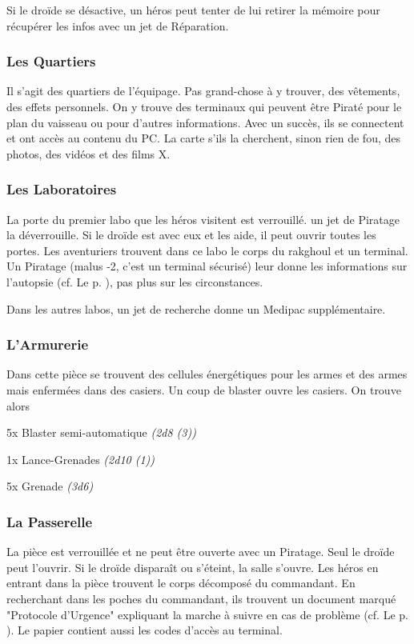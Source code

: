 Si le droïde se désactive, un héros peut tenter de lui retirer la mémoire pour récupérer les infos avec un jet de Réparation. 

\subsubsection{Les Quartiers}
Il s’agit des quartiers de l’équipage. Pas grand-chose à y trouver, des vêtements, des effets personnels. On y trouve des terminaux qui peuvent être Piraté pour le plan du vaisseau ou pour d’autres informations. Avec un succès, ils se connectent et ont accès au contenu du PC. La carte s’ils la cherchent, sinon rien de fou, des photos, des vidéos et des films X.

\subsubsection{Les Laboratoires}
La porte du premier labo que les héros visitent est verrouillé. un jet de Piratage la déverrouille. Si le droïde est avec eux et les aide, il peut ouvrir toutes les portes. Les aventuriers trouvent dans ce labo le corps du rakghoul et un terminal. Un Piratage (malus -2, c’est un terminal sécurisé) leur donne les informations sur l’autopsie (cf. Le  p. \pageref{sec:pelican-jdb}), pas plus sur les circonstances.

Dans les autres labos, un jet de recherche donne un Medipac supplémentaire.

\subsubsection{L’Armurerie}
Dans cette pièce se trouvent des cellules énergétiques pour les armes et des armes mais enfermées dans des casiers. Un coup de blaster ouvre les casiers. On trouve alors 
\begin{rebelist}
	\item 5x Blaster semi-automatique \emph{(2d8 (3))}
	\item 1x Lance-Grenades \emph{(2d10 (1))}
	\item 5x Grenade \emph{(3d6)}
\end{rebelist}

\subsubsection{La Passerelle}
La pièce est verrouillée et ne peut être ouverte avec un Piratage. Seul le droïde peut l’ouvrir. Si le droïde disparaît ou s’éteint, la salle s’ouvre. Les héros en entrant dans la pièce trouvent le corps décomposé du commandant. En recherchant dans les poches du commandant, ils trouvent un document marqué "Protocole d’Urgence" expliquant la marche à suivre en cas de problème (cf. Le  p. \pageref{sec:pelican-jdb}). Le papier contient aussi les codes d’accès au terminal.

